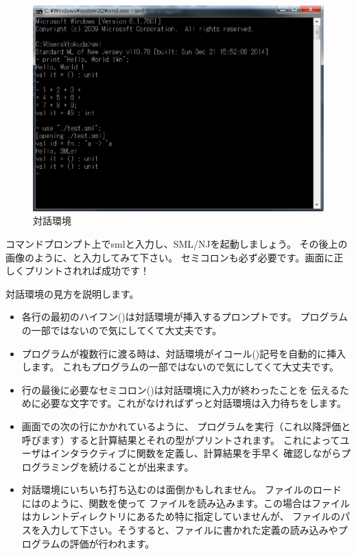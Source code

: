 \documentclass[11pt,a4paper]{jarticle}
\begin{document}
\begin{figure}[htbp]
  \centering
  \includegraphics[scale=0.5]{./interactive.eps}
  \caption{対話環境}
  \label{fig:hello}
\end{figure}

コマンドプロンプト上でsmlと入力し、SML/NJを起動しましょう。
その後上の画像のように、と入力してみて下さい。
セミコロンも必ず必要です。画面に正しくプリントされれば成功です！

対話環境の見方を説明します。

\begin{itemize}
\item 各行の最初のハイフン(\prog{-})は対話環境が挿入するプロンプトです。
  プログラムの一部ではないので気にしてくて大丈夫です。
\item プログラムが複数行に渡る時は、対話環境がイコール(\prog{=})記号を自動的に挿入します。
  これもプログラムの一部ではないので気にしてくて大丈夫です。
\item 行の最後に必要なセミコロン(\prog{;})は対話環境に入力が終わったことを
  伝えるために必要な文字です。これがなければずっと対話環境は入力待ちをします。
\item 画面での次の行にかかれているように、
  プログラムを実行（これ以降評価と呼びます）すると計算結果とそれの型がプリントされます。
  これによってユーザはインタラクティブに関数を定義し、計算結果を手早く
  確認しながらプログラミングを続けることが出来ます。
\item 対話環境にいちいち打ち込むのは面倒かもしれません。
  ファイルのロードにはのように、関数を使って
  ファイルを読み込みます。この場合はファイルはカレントディレクトリにあるため特に指定していませんが、
  ファイルのパスを入力して下さい。そうすると、ファイルに書かれた定義の読み込みやプログラムの評価が行われます。
\end{itemize}
\end{document}
